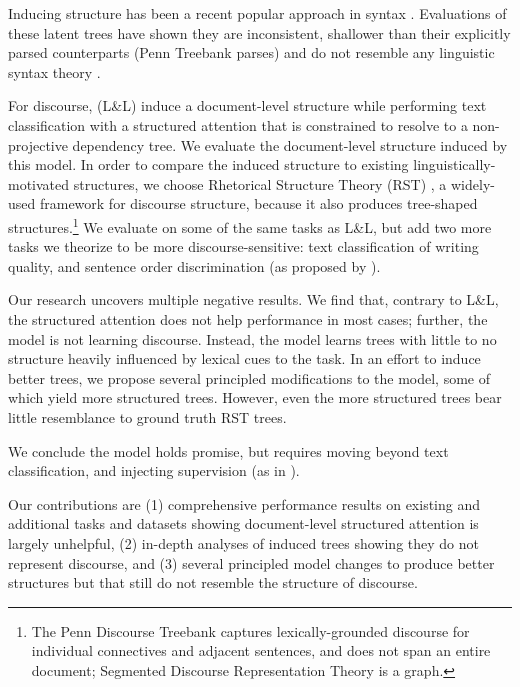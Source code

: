 Inducing structure has been a recent popular approach in syntax \cite{Yogatama:2017,Choi:2018,Bisk:2018}. Evaluations of these latent trees have shown they are inconsistent, shallower than their explicitly parsed counterparts (Penn Treebank parses) and do not resemble any linguistic syntax theory \cite{Williams:2018}.

For discourse, \citet{Liu:2018} (L\&L) induce a document-level structure while performing text classification with a structured attention that is constrained to resolve to a non-projective dependency tree. We evaluate the document-level structure induced by this model. In order to compare the induced structure to existing linguistically-motivated structures, we choose Rhetorical Structure Theory (RST) \cite{Mann:1988}, a widely-used framework for discourse structure, because it also produces tree-shaped structures.\footnote{The Penn Discourse Treebank \citep[PDTB;][]{Prasad:2008} captures lexically-grounded discourse for individual connectives and adjacent sentences, and does not span an entire document; Segmented Discourse Representation Theory \cite{Lascarides:2008} is a graph.}
 We evaluate on some of the same tasks as L\&L, but add two more tasks we theorize to be more discourse-sensitive: text classification of writing quality, and sentence order discrimination (as proposed by \citet{Barzilay:2008}). 

Our research uncovers multiple negative results. We find that, contrary to L\&L, the structured attention does not help performance in most cases; further, the model is not learning discourse. Instead, the model learns trees with little to no structure heavily influenced by lexical cues to the task. In an effort to induce better trees, we propose several principled modifications to the model, some of which yield more structured trees. However, even the more structured trees bear little resemblance to ground truth RST trees.

We conclude the model holds promise, but requires moving beyond text classification, and injecting supervision (as in \citet{Strubell:2018}). 

Our contributions are (1) comprehensive performance results on existing and additional tasks and datasets showing document-level structured attention is largely unhelpful, (2) in-depth analyses of induced trees showing they do not represent discourse, and (3) several principled model changes to produce better structures but that still do not resemble the structure of discourse.

